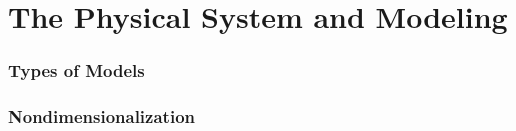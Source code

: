
\section{The Physical System and Modeling}

\begin{frame}
  \frametitle{Types of Models}

\end{frame}

\begin{frame}
  \frametitle{Nondimensionalization}

\end{frame}

\begin{frame}
  \frametitle{}

\end{frame}


